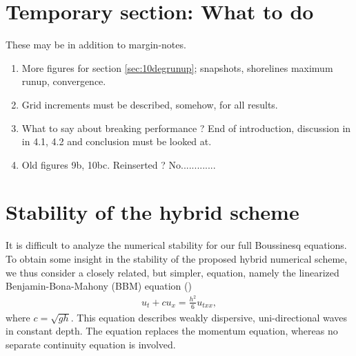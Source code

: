 \documentclass[review]{elsarticle}
\newcommand{\BoussClaw}{\textsc{BoussClaw} }
\begin{document}

\section*{Temporary section: What to do}
These may be in addition to margin-notes.
\begin{enumerate}
\item More figures for section \ref{sec:10degrunup}; snapshots, shorelines 
maximum runup, convergence.
\item Grid increments must be described, somehow, for all results.
\item What to say about breaking performance ? End of introduction, discussion in in 4.1, 4.2 and conclusion must be looked at.
\item Old figures 9b, 10bc. Reinserted ? No.............
\end{enumerate}

\appendix

\section{Stability of the hybrid scheme}
\label{append:stab}
It is difficult to analyze the numerical stability for  our full Boussinesq
equations. 
To obtain some insight in the  stability of the proposed hybrid numerical scheme,
we thus consider a closely related, but simpler, equation, namely the 
linearized Benjamin-Bona-Mahony (BBM)
equation (\cite{benjamin1972model}) 
\begin{align}
u_t + c u_x = \frac{h^2}{6}u_{txx},
\label{eq:basic_1}
\end{align}
where $c=\sqrt{gh}$.
This equation describes weakly dispersive, uni-directional waves in constant
depth. The equation replaces the momentum equation, whereas no separate
continuity equation is involved.
\end{document}
